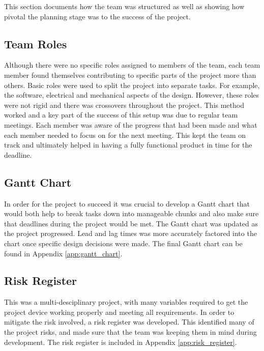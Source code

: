 \documentclass[a4paper,12pt]{article}
\begin{document}
This section documents how the team was structured as well as showing how pivotal the planning stage was to the success of the project.

\subsection{Team Roles}
\label{sec:team_roles}

Although there were no specific roles assigned to members of the team, each team member found themselves contributing to specific parts of the project more than others. Basic roles were used to split the project into separate tasks. For example, the software, electrical and mechanical aspects of the design. However, these roles were not rigid and there was crossovers throughout the project. This method worked and a key part of the success of this setup was due to regular team meetings. Each member was aware of the progress that had been made and what each member needed to focus on for the next meeting. This kept the team on track and ultimately helped in having a fully functional product in time for the deadline.

\subsection{Gantt Chart}
\label{sec:gantt_chart}

In order for the project to succeed it was crucial to develop a Gantt chart that would both help to break tasks down into manageable chunks and also make sure that deadlines during the project would be met. The Gantt chart was updated as the project progressed. Lead and lag times was more accurately factored into the chart once specific design decisions were made. The final Gantt chart can be found in Appendix \ref{app:gantt_chart}.

\subsection{Risk Register}
\label{sec:risk_register}

This was a multi-desciplinary project, with many variables required to get the project device working properly and meeting all requirements. In order to mitigate the risk involved, a risk register was developed. This identified many of the project risks, and made sure that the team was keeping them in mind during development. The risk register is included in Appendix \ref{app:risk_register}.
\end{document}
